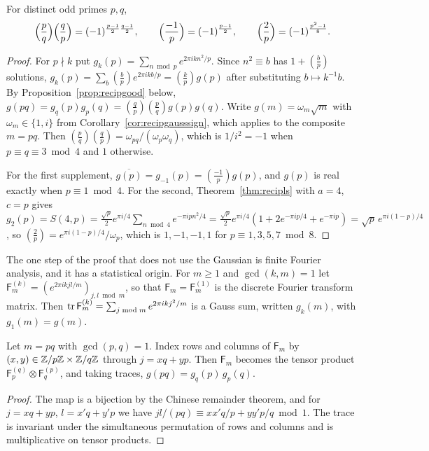 \begin{corollary}\label{cor:recipqr}
For distinct odd primes $p,q$,
\[
\Bigl(\frac pq\Bigr)\Bigl(\frac qp\Bigr)=(-1)^{\frac{p-1}2\frac{q-1}2},\qquad \Bigl(\frac{-1}p\Bigr)=(-1)^{\frac{p-1}2},\qquad\Bigl(\frac2p\Bigr)=(-1)^{\frac{p^2-1}8}.
\]
\end{corollary}

\begin{proof}
For $p\nmid k$ put $g_k(p)=\sum_{n\bmod p}e^{2\pi ikn^2/p}$. Since $n^2\equiv b$ has $1+(\frac bp)$ solutions, $g_k(p)=\sum_b(\frac bp)e^{2\pi ikb/p}=(\frac kp)g(p)$ after substituting $b\mapsto k^{-1}b$. By Proposition~\ref{prop:recipgood} below, $g(pq)=g_q(p)g_p(q)=(\frac qp)(\frac pq)g(p)g(q)$. Write $g(m)=\omega_m\sqrt m$ with $\omega_m\in\{1,i\}$ from Corollary~\ref{cor:recipgausssign}, which applies to the composite $m=pq$. Then $(\frac pq)(\frac qp)=\omega_{pq}/(\omega_p\omega_q)$, which is $1/i^2=-1$ when $p\equiv q\equiv3\bmod4$ and $1$ otherwise.

For the first supplement, $\overline{g(p)}=g_{-1}(p)=(\frac{-1}p)g(p)$, and $g(p)$ is real exactly when $p\equiv1\bmod4$. For the second, Theorem~\ref{thm:recipls} with $a=4$, $c=p$ gives $g_2(p)=S(4,p)=\frac{\sqrt p}2e^{\pi i/4}\sum_{n\bmod4}e^{-\pi ipn^2/4}=\frac{\sqrt p}2e^{\pi i/4}(1+2e^{-\pi ip/4}+e^{-\pi ip})=\sqrt p\,e^{\pi i(1-p)/4}$, so $(\frac2p)=e^{\pi i(1-p)/4}/\omega_p$, which is $1,-1,-1,1$ for $p\equiv1,3,5,7\bmod8$.
\end{proof}

The one step of the proof that does not use the Gaussian is finite Fourier analysis, and it has a statistical origin. For $m\ge1$ and $\gcd(k,m)=1$ let $\mathsf F_m^{(k)}=(e^{2\pi ikjl/m})_{j,l\bmod m}$, so that $\mathsf F_m=\mathsf F_m^{(1)}$ is the discrete Fourier transform matrix. Then $\operatorname{tr}\mathsf F_m^{(k)}=\sum_{j\bmod m}e^{2\pi ikj^2/m}$ is a Gauss sum, written $g_k(m)$, with $g_1(m)=g(m)$.

\begin{proposition}\label{prop:recipgood}
Let $m=pq$ with $\gcd(p,q)=1$. Index rows and columns of $\mathsf F_m$ by $(x,y)\in\mathbb{Z}/p\mathbb{Z}\times\mathbb{Z}/q\mathbb{Z}$ through $j=xq+yp$. Then $\mathsf F_m$ becomes the tensor product $\mathsf F_p^{(q)}\otimes\mathsf F_q^{(p)}$, and taking traces, $g(pq)=g_q(p)\,g_p(q)$.
\end{proposition}

\begin{proof}
The map is a bijection by the Chinese remainder theorem, and for $j=xq+yp$, $l=x'q+y'p$ we have $jl/(pq)\equiv xx'q/p+yy'p/q\bmod1$. The trace is invariant under the simultaneous permutation of rows and columns and is multiplicative on tensor products.
\end{proof}

